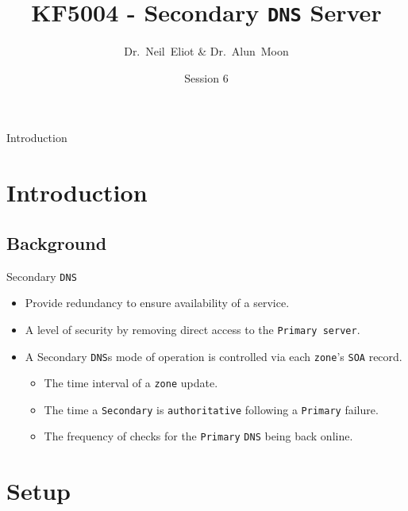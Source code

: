 \documentclass[xcolor=table,aspectratio=169]{beamer}
\title{KF5004 - Secondary \texttt{DNS} Server}
\author{Dr.~Neil~Eliot \& Dr.~Alun~Moon}
\institute[Northumbria University] %
{
  Department of Computer and Information Sciences\\
  University of Northumbria
}
\date{Session 6}
\begin{document}
\begin{frame}
  \titlepage
\end{frame}

\begin{frame}{Introduction}
  \tableofcontents
\end{frame}


\section{Introduction}
\subsection{Background}
\begin{frame}{Secondary \texttt{DNS}}
  \begin{itemize}
    \item Provide redundancy to ensure availability of a service.
    \item A level of security by removing direct access to the \texttt{Primary server}.
    \item A Secondary \texttt{DNS}s mode of operation is controlled via each \texttt{zone}’s \texttt{SOA} record.
      \begin{itemize}
        \item The time interval of a \texttt{zone} update.
        \item The time a \texttt{Secondary} is \texttt{authoritative} following a \texttt{Primary} failure.
        \item The frequency of checks for the \texttt{Primary} \texttt{DNS} being back online.
      \end{itemize}
  \end{itemize}
\end{frame}

\section{Setup}
\end{document}
